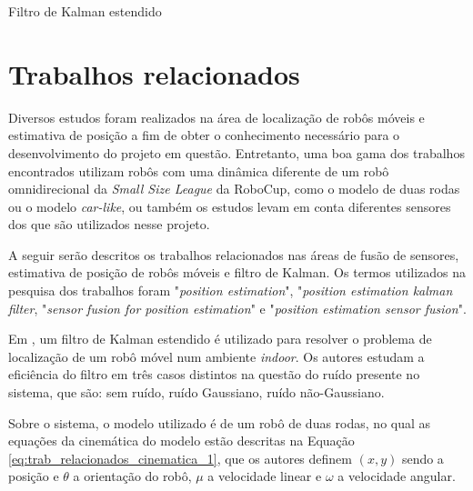 \documentclass[acronym, symbols, table]{fei}
\begin{document}
			\begin{algorithm}
					\caption{Filtro de Kalman estendido}\label{alg:ekf_algoritmo}
			\end{algorithm}
			
\chapter{Trabalhos relacionados}\label{sec:trab_relacionados}
Diversos estudos foram realizados na área de localização de robôs móveis e estimativa de posição a fim de obter o conhecimento necessário para o desenvolvimento do projeto em questão. Entretanto, uma boa gama dos trabalhos encontrados utilizam robôs com uma dinâmica diferente de um robô omnidirecional da \textit{Small Size League} da RoboCup, como o modelo de duas rodas ou o modelo \textit{car-like}, ou também os estudos levam em conta diferentes sensores dos que são utilizados nesse projeto.

A seguir serão descritos os trabalhos relacionados nas áreas de fusão de sensores, estimativa de posição de robôs móveis e filtro de Kalman. Os termos utilizados na pesquisa dos trabalhos foram "\textit{position estimation}", "\textit{position estimation kalman filter}, "\textit{sensor fusion for position estimation}" e "\textit{position estimation sensor fusion}".

Em \textcite{eman2020mobile}, um filtro de Kalman estendido é utilizado para resolver o problema de localização de um robô móvel num ambiente \textit{indoor}. Os autores estudam a eficiência do filtro em três casos distintos na questão do ruído presente no sistema, que são: sem ruído, ruído Gaussiano, ruído não-Gaussiano.

Sobre o sistema, o modelo utilizado é de um robô de duas rodas, no qual as equações da cinemática do modelo estão descritas na Equação \eqref{eq:trab_relacionados_cinematica_1}, que os autores definem $(x, y)$ sendo a posição e $\theta$ a orientação do robô, $\mu$ a velocidade linear e $\omega$ a velocidade angular.
\end{document}
